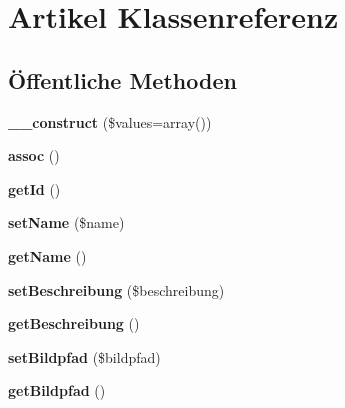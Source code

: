 \hypertarget{classArtikel}{\section{\-Artikel \-Klassenreferenz}
\label{classArtikel}
}
\subsection*{Öffentliche \-Methoden}
\begin{DoxyCompactItemize}
\item 
\hypertarget{classArtikel_a79dc6e027830bb0449f098523c96d5d1}{{\bfseries \-\_\-\-\_\-construct} (\$values=array())}\label{classArtikel_a79dc6e027830bb0449f098523c96d5d1}

\item 
\hypertarget{classArtikel_a15f30f265d0f016165d1b550e8197b2d}{{\bfseries assoc} ()}\label{classArtikel_a15f30f265d0f016165d1b550e8197b2d}

\item 
\hypertarget{classArtikel_a6f3f6b0a8aa1dc76308aa7327ace0725}{{\bfseries get\-Id} ()}\label{classArtikel_a6f3f6b0a8aa1dc76308aa7327ace0725}

\item 
\hypertarget{classArtikel_a8ff04283395691a3c3d321371289efc3}{{\bfseries set\-Name} (\$name)}\label{classArtikel_a8ff04283395691a3c3d321371289efc3}

\item 
\hypertarget{classArtikel_a0771b00f62ca960907a8ea3e4680b973}{{\bfseries get\-Name} ()}\label{classArtikel_a0771b00f62ca960907a8ea3e4680b973}

\item 
\hypertarget{classArtikel_af1e82f057356b080ce94c82948236670}{{\bfseries set\-Beschreibung} (\$beschreibung)}\label{classArtikel_af1e82f057356b080ce94c82948236670}

\item 
\hypertarget{classArtikel_a777571a2f295d5292f9b9ce3d5cac8d2}{{\bfseries get\-Beschreibung} ()}\label{classArtikel_a777571a2f295d5292f9b9ce3d5cac8d2}

\item 
\hypertarget{classArtikel_af9331938501e36c365613dc058f6818f}{{\bfseries set\-Bildpfad} (\$bildpfad)}\label{classArtikel_af9331938501e36c365613dc058f6818f}

\item 
\hypertarget{classArtikel_aad17675985534337a75b24f36fe7fb0b}{{\bfseries get\-Bildpfad} ()}\label{classArtikel_aad17675985534337a75b24f36fe7fb0b}


\end{DoxyCompactItemize}
